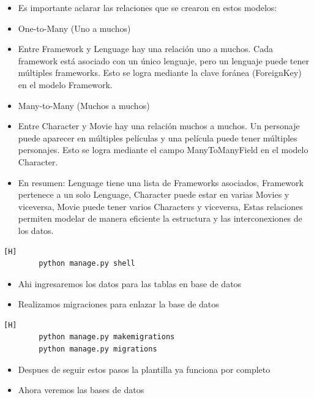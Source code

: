 \documentclass{article}
\begin{document}
	\begin{itemize}
		\item Es importante aclarar las relaciones que se crearon en estos modelos:
		\item One-to-Many (Uno a muchos)
		\item Entre Framework y Lenguage hay una relación uno a muchos. Cada framework está asociado con un único lenguaje, pero un lenguaje puede tener múltiples frameworks. Esto se logra mediante la clave foránea (ForeignKey) en el modelo Framework.
		\item Many-to-Many (Muchos a muchos)
		\item Entre Character y Movie hay una relación muchos a muchos. Un personaje puede aparecer en múltiples películas y una película puede tener múltiples personajes. Esto se logra mediante el campo ManyToManyField en el modelo Character.
		\item En resumen: Lenguage tiene una lista de Frameworks asociados, Framework pertenece a un solo Lenguage, Character puede estar en varias Movies y viceversa, Movie puede tener varios Characters y viceversa, Estas relaciones permiten modelar de manera eficiente la estructura y las interconexiones de los datos.
	\end{itemize}
	\begin{lstlisting}[language=bash,caption={Ingresamos a shell de python}][H]
		python manage.py shell
	\end{lstlisting}
	\begin{itemize}
		\item Ahi ingresaremos los datos para las tablas en base de datos
	\end{itemize}
	\begin{itemize}
		\item Realizamos migraciones para enlazar la base de datos
	\end{itemize}
	\begin{lstlisting}[language=bash,caption={Codigo para realizar migraciones}][H]
		python manage.py makemigrations
		python manage.py migrations
	\end{lstlisting}
	\begin{itemize}
		\item Despues de seguir estos pasos la plantilla ya funciona por completo
		\item Ahora veremos las bases de datos
	\end{itemize}
\end{document}
